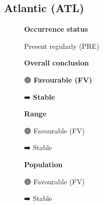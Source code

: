 \documentclass[
  10pt,
  letterpaper,
  DIV=11,
  numbers=noendperiod]{scrartcl}
\begin{document}
\subsection{Atlantic (ATL)}\label{atlantic-atl}

\begin{figure}

\begin{minipage}{0.33\linewidth}
\textbf{Occurrence status}\end{minipage}%
%
\begin{minipage}{0.44\linewidth}
Present regularly (PRE)\end{minipage}%
%
\begin{minipage}{0.22\linewidth}
\end{minipage}%

\end{figure}%

\begin{figure}

\begin{minipage}{0.33\linewidth}
\textbf{Overall conclusion}\end{minipage}%
%
\begin{minipage}{0.44\linewidth}
🟢 \textbf{Favourable (FV)}\end{minipage}%
%
\begin{minipage}{0.22\linewidth}
➡️ \textbf{Stable}\end{minipage}%

\end{figure}%

\begin{figure}

\begin{minipage}{0.33\linewidth}
\textbf{Range}\end{minipage}%
%
\begin{minipage}{0.44\linewidth}
🟢 Favourable (FV)\end{minipage}%
%
\begin{minipage}{0.22\linewidth}
➡️ Stable\end{minipage}%

\end{figure}%

\begin{figure}

\begin{minipage}{0.33\linewidth}
\textbf{Population}\end{minipage}%
%
\begin{minipage}{0.44\linewidth}
🟢 Favourable (FV)\end{minipage}%
%
\begin{minipage}{0.22\linewidth}
➡️ Stable\end{minipage}%

\end{figure}%
\end{document}
